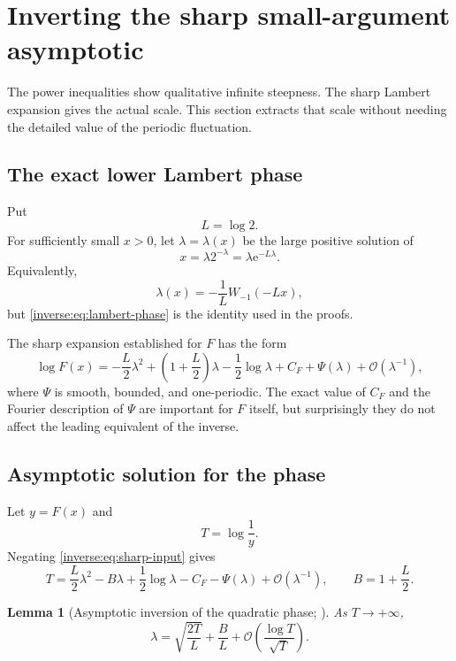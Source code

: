 \documentclass[11pt,oneside]{article}
\newtheorem{lemma}[theorem]{Lemma}
\theoremstyle{definition}
\theoremstyle{remark}
\newcommand{\e}{\mathrm e}
\newcommand{\bigO}{\mathcal O}
\begin{document}
\section{Inverting the sharp small-argument asymptotic}
\label{inverse:sec:inverse-asymptotic}

The power inequalities show qualitative infinite steepness.  The sharp
Lambert expansion gives the actual scale.  This section extracts that
scale without needing the detailed value of the periodic fluctuation.

\subsection{The exact lower Lambert phase}

Put
\[
 L=\log2.
\]
For sufficiently small $x>0$, let $\lambda=\lambda(x)$ be the large
positive solution of
\begin{equation}
 x=\lambda2^{-\lambda}
   =\lambda\e^{-L\lambda}. \label{inverse:eq:lambert-phase}
\end{equation}
Equivalently,
\[
 \lambda(x)=-\frac1L W_{-1}(-Lx),
\]
but \eqref{inverse:eq:lambert-phase} is the identity used in the proofs.

The sharp expansion established for $F$ has the form
\begin{equation}
 \log F(x)
 =-\frac L2\lambda^2+
   \left(1+\frac L2\right)\lambda
   -\frac12\log\lambda
   +C_F+\Psi(\lambda)
   +\bigO(\lambda^{-1}), \label{inverse:eq:sharp-input}
\end{equation}
where $\Psi$ is smooth, bounded, and one-periodic.  The exact value of
$C_F$ and the Fourier description of $\Psi$ are important for $F$ itself,
but surprisingly they do not affect the leading equivalent of the
inverse.

\subsection{Asymptotic solution for the phase}

Let $y=F(x)$ and
\[
 T=\log\frac1y.
\]
Negating \eqref{inverse:eq:sharp-input} gives
\begin{equation}
 T=\frac L2\lambda^2-B\lambda+\frac12\log\lambda
     -C_F-\Psi(\lambda)+\bigO(\lambda^{-1}),
 \qquad B=1+\frac L2. \label{inverse:eq:T-lambda}
\end{equation}

\begin{lemma}[Asymptotic inversion of the quadratic phase; \Derived]
\label{inverse:lem:lambda-from-T}
As $T\to+\infty$,
\[
 \lambda
 =\sqrt{\frac{2T}{L}}+\frac BL
   +\bigO\!\left(\frac{\log T}{\sqrt T}\right).
\]
\end{lemma}
\end{document}
